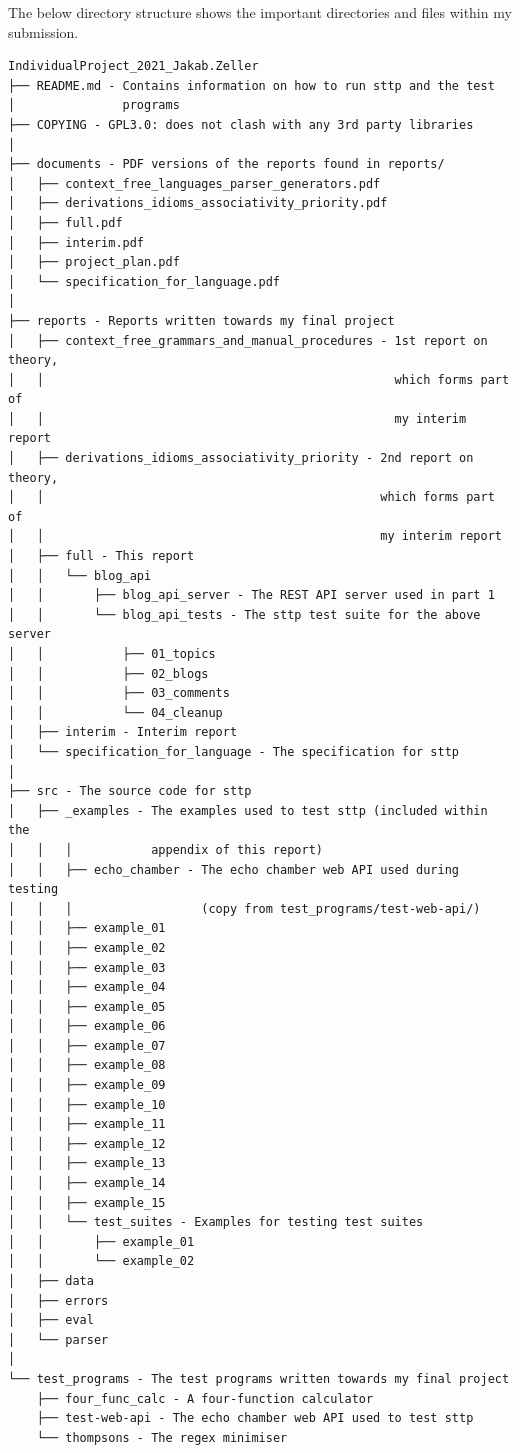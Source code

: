 \documentclass[]{full}
\theoremstyle{definition}
\begin{document}
The below directory structure shows the important directories and files within my submission.

\begin{verbatim}
IndividualProject_2021_Jakab.Zeller
├── README.md - Contains information on how to run sttp and the test
│               programs
├── COPYING - GPL3.0: does not clash with any 3rd party libraries
│
├── documents - PDF versions of the reports found in reports/
│   ├── context_free_languages_parser_generators.pdf
│   ├── derivations_idioms_associativity_priority.pdf
│   ├── full.pdf
│   ├── interim.pdf
│   ├── project_plan.pdf
│   └── specification_for_language.pdf
│
├── reports - Reports written towards my final project
│   ├── context_free_grammars_and_manual_procedures - 1st report on theory,
│   │                                                 which forms part of
│   │                                                 my interim report
│   ├── derivations_idioms_associativity_priority - 2nd report on theory,
│   │                                               which forms part of
│   │                                               my interim report
│   ├── full - This report
│   │   └── blog_api
│   │       ├── blog_api_server - The REST API server used in part 1
│   │       └── blog_api_tests - The sttp test suite for the above server
│   │           ├── 01_topics
│   │           ├── 02_blogs
│   │           ├── 03_comments
│   │           └── 04_cleanup
│   ├── interim - Interim report
│   └── specification_for_language - The specification for sttp
│
├── src - The source code for sttp
│   ├── _examples - The examples used to test sttp (included within the
│   │   │           appendix of this report)
│   │   ├── echo_chamber - The echo chamber web API used during testing
│   │   │                  (copy from test_programs/test-web-api/)
│   │   ├── example_01
│   │   ├── example_02
│   │   ├── example_03
│   │   ├── example_04
│   │   ├── example_05
│   │   ├── example_06
│   │   ├── example_07
│   │   ├── example_08
│   │   ├── example_09
│   │   ├── example_10
│   │   ├── example_11
│   │   ├── example_12
│   │   ├── example_13
│   │   ├── example_14
│   │   ├── example_15
│   │   └── test_suites - Examples for testing test suites
│   │       ├── example_01
│   │       └── example_02
│   ├── data
│   ├── errors
│   ├── eval
│   └── parser
│
└── test_programs - The test programs written towards my final project
    ├── four_func_calc - A four-function calculator
    ├── test-web-api - The echo chamber web API used to test sttp
    └── thompsons - The regex minimiser
\end{verbatim}
\end{document}
